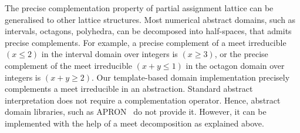 %
%
The precise complementation property of partial assignment lattice can
be generalised to other lattice structures.  Most numerical abstract
domains, such as intervals, octagons, polyhedra, can be decomposed
into half-spaces, that admits precise complements.  For example, a
precise complement of a meet irreducible $(x \leq 2)$ in the interval
domain over integers is $(x \geq 3)$, or the precise complement of
the meet irreducible $(x+y \leq 1)$ in the octagon domain over
integers is $(x+y \geq 2)$.  Our template-based domain implementation
precisely complements a meet irreducible in an abstraction.  
% 
%
Standard abstract interpretation does not require a complementation
operator. Hence, abstract domain libraries, such as APRON~\cite{apron}
do not provide it.  However, it can be implemented with the help of a
meet decomposition as explained above.

